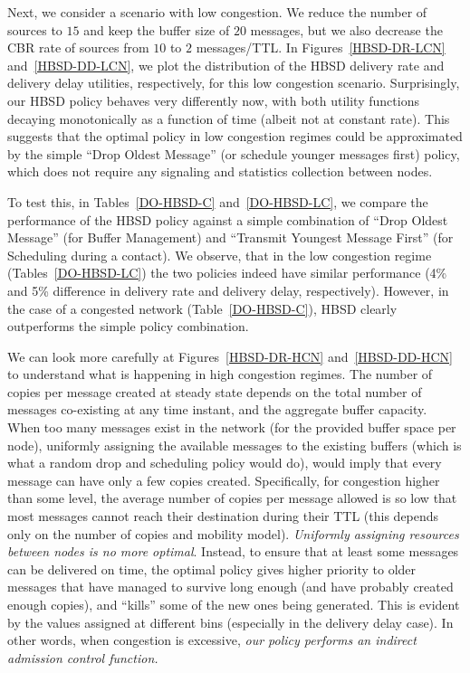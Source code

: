 Next, we consider a scenario with low congestion. We reduce the number of sources to $15$ and keep the buffer size of $20$ messages, but we also decrease the CBR rate of sources from
$10$ to $2$ messages/TTL. In Figures~\ref{HBSD-DR-LCN} and~\ref{HBSD-DD-LCN}, we plot the distribution of the HBSD delivery rate and delivery delay utilities, respectively, for this low congestion scenario. Surprisingly, our HBSD policy behaves very differently now, with both utility functions decaying monotonically as a function of time (albeit not at constant rate). This suggests that the optimal policy in low congestion regimes could be approximated by the simple ``Drop Oldest Message'' (or schedule younger messages first) policy, which does not require any signaling and statistics collection between nodes.

To test this, in Tables~\ref{DO-HBSD-C} and~\ref{DO-HBSD-LC}, we compare the performance of the HBSD policy against a simple combination of ``Drop Oldest Message'' (for Buffer Management) and ``Transmit Youngest Message First'' (for Scheduling during a contact). We observe, that in the low congestion regime (Tables~\ref{DO-HBSD-LC}) the two policies indeed have similar performance (4\% and 5\% difference in delivery rate and delivery delay, respectively). However, in the case of a congested network (Table~\ref{DO-HBSD-C}), HBSD clearly outperforms the simple policy combination.

We can look more carefully at Figures~\ref{HBSD-DR-HCN} and~\ref{HBSD-DD-HCN} to understand what is happening in high congestion regimes. The number of copies per message created at steady state depends on the total number of messages co-existing at any time instant, and the aggregate buffer capacity. When too many messages exist in the network (for the provided buffer space per node), uniformly assigning the available messages to the existing buffers (which is what a random drop and scheduling policy would do), would imply that every message can have only a few copies created. Specifically, for congestion higher than some level, the average number of copies per message allowed is so low that most messages cannot reach their destination during their TTL (this depends only on the number of copies and mobility model). \emph{Uniformly assigning resources between nodes is no more optimal}. Instead, to ensure that at least some messages can be delivered on time, the optimal policy gives higher priority to older messages that have managed to survive long enough (and have probably created enough copies), and ``kills'' some of the new ones being generated. This is evident by the values assigned at different bins (especially in the delivery delay case). In other words, when congestion is excessive, \emph{our policy performs an indirect admission control function.}

